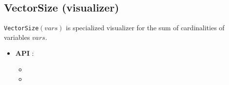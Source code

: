 \subsection{VectorSize (visualizer)}\label{vectorsize:visu}\hypertarget{vectorsize:visu}{}
\begin{notedef}
  \texttt{VectorSize}$(vars)$ is specialized visualizer for the sum of cardinalities of variables $vars$.
\end{notedef}

\begin{itemize}
	\item \textbf{API} : 
	\begin{itemize}
	\item {}
	\item {}
	\end{itemize}
\end{itemize}

%

